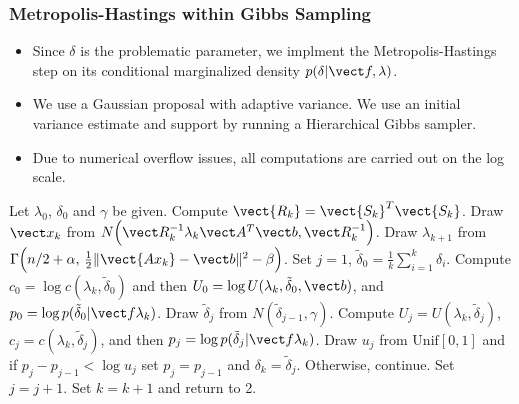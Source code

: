 \documentclass[]{beamer}
\begin{document}
\begin{frame}[t]
  \frametitle{Metropolis-Hastings within Gibbs Sampling}
  \vspace{-1em}
  {\scriptsize
  \begin{itemize}
    \itemsep 1.1em
    \item Since $\delta$ is the problematic parameter, we implment the Metropolis-Hastings step on its conditional marginalized density $p(\delta|\vect f,\lambda)$. 
    \item We use a Gaussian proposal with adaptive variance.  We use an initial variance estimate and support by running a Hierarchical Gibbs sampler.
    \item Due to numerical overflow issues, all computations are carried out on the log scale.
  \end{itemize}
  \begin{algorithmic}[1]
  \STATE Let $\lambda_0$, $\delta_0$ and $\gamma$ be given.
  \STATE Compute $\vect {R_k} = \vect{S_k}^T \vect{S_k}$. 
  \STATE Draw $\vect x_k$ from $N\Big( \vect R_k^{-1}\lambda_k \vect A^T\vect b, \vect R_k^{-1} \Big)$.
  \STATE Draw $\lambda_{k+1}$ from $\Gamma \Big(n/2+\alpha,\,\frac12\|\vect{Ax_k} - \vect b\|^2 - \beta \Big)$.
  \alert{\STATE Set $j = 1$, $\tilde \delta_0 = \frac 1k \sum_{i=1}^k \delta_i$.  Compute $c_0 = \log c(\lambda_k,\tilde \delta_0)$ and then $U_0 = \log U(\lambda_k,\tilde \delta_0,\vect b)$, and $p_0 = \log p(\tilde \delta_0|\vect f \lambda _k)$.
    \STATE Draw $\tilde \delta_j$ from $N(\tilde \delta_{j-1}, \gamma)$.
    \STATE Compute $U_j = U(\lambda_k,\tilde \delta_j)$, $c_j = c(\lambda_k,\tilde \delta_j)$, and then $p_j = \log p(\tilde \delta_j|\vect f \lambda _k)$.
    \STATE Draw $u_j$ from $\mathrm{Unif}[0,1]$ and if $ p_j - p_{j-1} < \log u_j$ set $p_j = p_{j-1}$ and $\delta_{k} = \tilde \delta_j$. Otherwise, continue.
    \STATE Set $j=j+1$.
  \ENDWHILE
  }
  \STATE Set $k=k+1$ and return to 2.
  \end{algorithmic}
  }
\end{frame}
\end{document}

